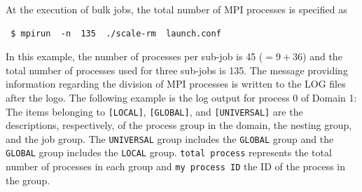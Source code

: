 
At the execution of bulk jobs, the total number of MPI processes is specified as 

\begin{verbatim}
 $ mpirun  -n  135  ./scale-rm  launch.conf
\end{verbatim}
In this example, the number of processes per sub-job is 45 ($=9 + 36$) and the total number of processes used for three sub-jobs is 135. The message providing information regarding the division of MPI processes is written to the LOG files after the \scalelib logo. The following example is the log output for process 0 of Domain 1:
The items belonging to \verb|[LOCAL]|, \verb|[GLOBAL]|, and \verb|[UNIVERSAL]| are the descriptions, respectively, of the process group in the domain, the nesting group, and the job group. The \verb|UNIVERSAL| group includes the \verb|GLOBAL| group and the \verb|GLOBAL| group includes the \verb|LOCAL| group. \verb|total process| represents the total number  of processes in each group and \verb|my process ID| the ID of the process in the group.

